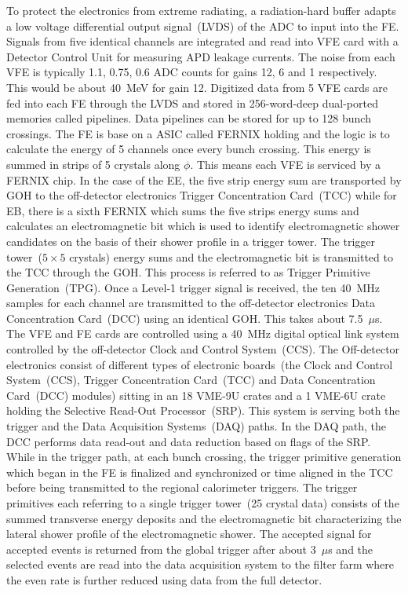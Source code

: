 To protect the electronics from extreme radiating, a radiation-hard buffer adapts a low voltage differential output signal~(LVDS) of the ADC to input into the FE. Signals from  five  identical channels are integrated and read into VFE card with a Detector Control Unit for measuring APD leakage currents. The noise from each VFE is typically 1.1, 0.75, 0.6 ADC counts for gains 12, 6 and 1 respectively. This would be about 40~MeV for gain 12.
Digitized data from 5 VFE cards are fed into each FE through the LVDS and stored in 256-word-deep dual-ported memories called pipelines. Data pipelines can be stored for up to 128 bunch crossings. The FE is base on a ASIC called FERNIX holding and the logic is to calculate the energy of 5 channels once every bunch crossing. This energy is summed in strips of 5 crystals  along $\phi$. This means each VFE is serviced by a FERNIX chip. In the case of the EE, the five strip energy sum are transported by GOH to the off-detector electronics Trigger Concentration Card~(TCC) while for EB, there is a sixth FERNIX which sums the five strips energy sums and calculates an electromagnetic bit which is used to identify electromagnetic shower candidates on the basis of their shower profile in a trigger tower. The trigger tower~($5\times5$ crystals) energy sums and the electromagnetic bit is transmitted to the TCC through the GOH. This process is referred to as Trigger Primitive Generation~(TPG). Once a Level-1 trigger signal is received, the ten 40~MHz samples for each channel are transmitted to the off-detector electronics Data Concentration Card~(DCC) using an identical GOH. This takes about 7.5~$\mu$s. The VFE and FE cards are controlled using a 40~MHz digital optical link system controlled by the off-detector Clock and Control System~(CCS). 
\newline
The Off-detector electronics consist of different types of electronic boards~(the Clock and Control System~(CCS), Trigger Concentration Card~(TCC) and Data Concentration Card~(DCC) modules) sitting in an 18 VME-9U crates and a 1 VME-6U crate holding the Selective Read-Out Processor~(SRP). This system is serving both the trigger and the  Data Acquisition Systems~(DAQ) paths. In the DAQ path, the DCC performs data read-out and data reduction based on flags of the SRP. While in the trigger path, at each bunch crossing, the trigger primitive generation which began in the FE is finalized and synchronized or time aligned in the TCC before being transmitted to the regional calorimeter triggers. The trigger primitives each referring to a single trigger tower~(25 crystal data) consists of the summed transverse energy deposits and the electromagnetic bit characterizing the lateral shower profile of the electromagnetic shower. The accepted signal for accepted events is returned from the global trigger after about 3~$\mu$s and the selected events are read into the data acquisition system to the filter farm where the even rate is further reduced using data from the full detector.


